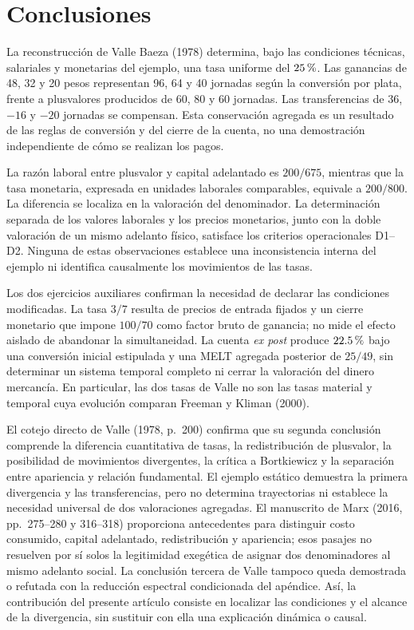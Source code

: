 \documentclass[10pt,twoside]{article}
\newcommand{\pct}{\ifmmode\text{\char37}\else\char37\fi}
\begin{document}
\section*{Conclusiones}
La reconstrucción de Valle Baeza (1978) determina, bajo las condiciones técnicas, salariales y monetarias del ejemplo, una tasa uniforme del $25\,\pct$. Las ganancias de 48, 32 y 20 pesos representan 96, 64 y 40 jornadas según la conversión por plata, frente a plusvalores producidos de 60, 80 y 60 jornadas. Las transferencias de $36$, $-16$ y $-20$ jornadas se compensan. Esta conservación agregada es un resultado de las reglas de conversión y del cierre de la cuenta, no una demostración independiente de cómo se realizan los pagos.

La razón laboral entre plusvalor y capital adelantado es $200/675$, mientras que la tasa monetaria, expresada en unidades laborales comparables, equivale a $200/800$. La diferencia se localiza en la valoración del denominador. La determinación separada de los valores laborales y los precios monetarios, junto con la doble valoración de un mismo adelanto físico, satisface los criterios operacionales D1--D2. Ninguna de estas observaciones establece una inconsistencia interna del ejemplo ni identifica causalmente los movimientos de las tasas.

Los dos ejercicios auxiliares confirman la necesidad de declarar las condiciones modificadas. La tasa $3/7$ resulta de precios de entrada fijados y un cierre monetario que impone $100/70$ como factor bruto de ganancia; no mide el efecto aislado de abandonar la simultaneidad. La cuenta \emph{ex post} produce $22.5\,\pct$ bajo una conversión inicial estipulada y una MELT agregada posterior de $25/49$, sin determinar un sistema temporal completo ni cerrar la valoración del dinero mercancía. En particular, las dos tasas de Valle no son las tasas material y temporal cuya evolución comparan Freeman y Kliman (2000).

El cotejo directo de Valle (1978, p.~200) confirma que su segunda conclusión comprende la diferencia cuantitativa de tasas, la redistribución de plusvalor, la posibilidad de movimientos divergentes, la crítica a Bortkiewicz y la separación entre apariencia y relación fundamental. El ejemplo estático demuestra la primera divergencia y las transferencias, pero no determina trayectorias ni establece la necesidad universal de dos valoraciones agregadas. El manuscrito de Marx (2016, pp.~275--280 y 316--318) proporciona antecedentes para distinguir costo consumido, capital adelantado, redistribución y apariencia; esos pasajes no resuelven por sí solos la legitimidad exegética de asignar dos denominadores al mismo adelanto social. La conclusión tercera de Valle tampoco queda demostrada o refutada con la reducción espectral condicionada del apéndice. Así, la contribución del presente artículo consiste en localizar las condiciones y el alcance de la divergencia, sin sustituir con ella una explicación dinámica o causal.
\end{document}
